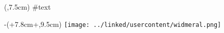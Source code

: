 \begin{textblock*}{7.6cm}(\rborder,7.5cm)
#text
\end{textblock*}
\begin{textblock*}{\textwidth-4.5cm-\columnsep}(\rborder+7.8cm+\columnsep,9.5cm)
\noindent
\texttt{[image: ../linked/usercontent/widmeral.png]}
\end{textblock*}
\vspace*{15cm}
